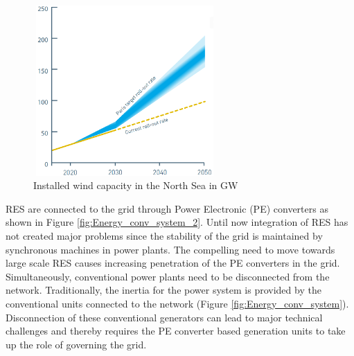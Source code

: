 \begin{figure}[H]
\centering
    \includegraphics[height = 6.5cm,width = 7cm]{Diagrams/Chapter_1/Paris_roll_out.PNG}
    \caption{Installed wind capacity in the North Sea in GW \cite{noauthor_vision_nodate}}
    \label{fig:Paris_roll_out}
\end{figure}

\gls{RES} are connected to the grid through Power Electronic (\gls{PE}) converters as shown in Figure \ref{fig:Energy_conv_system_2}. Until now integration of \gls{RES} has not created major problems since the stability of the grid is maintained by synchronous machines in power plants. The compelling need to move towards large scale \gls{RES} causes increasing penetration of the \gls{PE} converters in the grid. Simultaneously, conventional power plants need to be disconnected from the network. Traditionally, the inertia for the power system is provided by the conventional units connected to the network (Figure \ref{fig:Energy_conv_system}). Disconnection of these conventional generators can lead to major technical challenges and thereby requires the \gls{PE} converter based generation units to take up the role of governing the grid.

